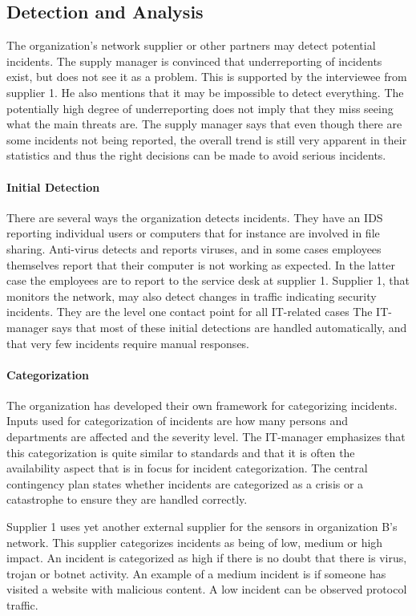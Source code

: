 \subsection{Detection and Analysis}
The organization's network supplier or other partners may detect potential incidents. The supply manager is convinced that underreporting of incidents exist, but does not see it as a problem. This is supported by the interviewee from supplier 1. He also mentions that it may be impossible to detect everything. The potentially high degree of underreporting does not imply that they miss seeing what the main threats are. The supply manager says that even though there are some incidents not being reported, the overall trend is still very apparent in their statistics and thus the right decisions can be made to avoid serious incidents. 

\paragraph{Initial Detection}
There are several ways the organization detects incidents. They have an \ac{IDS} reporting individual users or computers that for instance are involved in file sharing. Anti-virus detects and reports viruses, and in some cases employees themselves report that their computer is not working as expected. In the latter case the employees are to report to the service desk at supplier 1. Supplier 1, that monitors the network, may also detect changes in traffic indicating security incidents. They are the level one contact point for all IT-related cases The IT-manager says that most of these initial detections are handled automatically, and that very few incidents require manual responses. 

\paragraph{Categorization}
The organization has developed their own framework for categorizing incidents. Inputs used for categorization of incidents are how many persons and departments are affected and the severity level. The IT-manager emphasizes that this categorization is quite similar to standards and that it is often the availability aspect that is in focus for incident categorization. The central contingency plan states whether incidents are categorized as a crisis or a catastrophe to ensure they are handled correctly.

Supplier 1 uses yet another external supplier for the sensors in organization B's network. This supplier categorizes incidents as being of low, medium or high impact. An incident is categorized as high if there is no doubt that there is virus, trojan or botnet activity. An example of a medium incident is if someone has visited a website with malicious content. A low incident can be observed protocol traffic.

